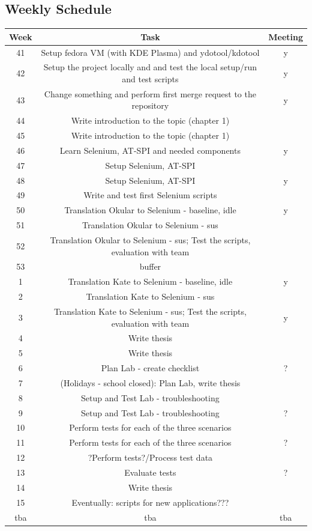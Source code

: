 \documentclass{article}
\begin{document}
\begin{center}
\section*{Weekly Schedule}
\begin{tabular}{ | c | c | c | }
 \hline
 Week & Task & Meeting \\
 \hline\hline
 41  & Setup fedora VM (with KDE Plasma) and ydotool/kdotool & y \\
 \hline
 42  & Setup the project locally and and test the local setup/run and test scripts & y \\
 \hline
 43  & Change something and perform first merge request to the repository & y \\
 \hline
 44  & Write introduction to the topic (chapter 1) & \\
 \hline
 45  & Write introduction to the topic (chapter 1) & \\
 \hline
 46  & Learn Selenium, AT-SPI and needed components & y \\
 \hline
 47  & Setup Selenium, AT-SPI & \\
 \hline
 48  &  Setup Selenium, AT-SPI & y \\
 \hline
 49  &  Write and test first Selenium scripts & \\
 \hline
 50  &  Translation Okular to Selenium - baseline, idle & y \\
 \hline
 51  & Translation Okular to Selenium - sus & \\
 \hline
 52  & Translation Okular to Selenium - sus; Test the scripts, evaluation with team & \\
 \hline
 53  & buffer & \\
 \hline
 1  & Translation Kate to Selenium - baseline, idle & y \\
 \hline
 2  & Translation Kate to Selenium - sus & \\
 \hline
 3  & Translation Kate to Selenium - sus; Test the scripts, evaluation with team & y \\
 \hline
 4  & Write thesis & \\
 \hline
 5  & Write thesis & \\
 \hline
 6  & Plan Lab - create checklist & ? \\
 \hline
 7  & (Holidays - school closed): Plan Lab, write thesis &  \\
 \hline
 8  & Setup and Test Lab - troubleshooting &  \\
 \hline
 9  & Setup and Test Lab - troubleshooting & ? \\
 \hline
 10  & Perform tests for each of the three scenarios & \\
 \hline
 11  & Perform tests for each of the three scenarios & ? \\
 \hline
 12  & ?Perform tests?/Process test data & \\
 \hline
 13 & Evaluate tests & ? \\
 \hline
 14 & Write thesis & \\
 \hline
 15 & Eventually: scripts for new applications??? & \\
 \hline
 tba & tba & tba \\
 \hline


\end{tabular}
\end{center}
\end{document}
